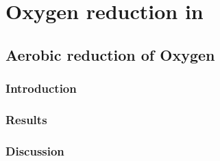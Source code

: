 \chapter{Oxygen reduction in \Nm{}}
\section{Aerobic reduction of Oxygen}
\subsection{Introduction}
\subsection{Results}
\subsection{Discussion}